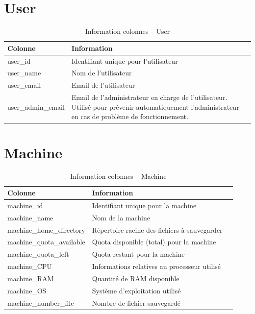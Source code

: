 \documentclass[a4paper,10pt, twoside]{report}
\begin{document}
\begin{spacing}{1.2}
\section{User}
\begin{table}[h!]
  \centering
  \def\arraystretch{1.5}
  \setlength{\fboxsep}{13pt} %
  \setlength{\fboxrule}{0pt} %
  \begin{tabular}{lm{6cm}m{6cm}}
   \rowcolor{arkred} 
    \arrayrulecolor{gray73}\hline
    \color{white} \textbf{Colonne} & \color{white} \textbf{Information}\\
    \hline
    user\_id & Identifiant unique pour l'utilisateur\\
    \hline
    user\_name & Nom de l'utilisateur\\
    \hline
    user\_email & Email de l'utilisateur\\
    \hline
    user\_admin\_email & Email de l'administrateur en charge de l'utilisateur.
    Utilis\'e pour pr\'evenir automatiquement l'administrateur en cas de
    probl\`eme de fonctionnement.
  \end{tabular}
  \caption{\label{tabDBRUser} Information colonnes -- User}
\end{table}

\section{Machine}
\begin{table}[h!]
  \centering
  \def\arraystretch{1.5}
  \setlength{\fboxsep}{13pt} %
  \setlength{\fboxrule}{0pt} %
  \begin{tabular}{lm{6cm}m{6cm}}
   \rowcolor{arkred} 
    \arrayrulecolor{gray73}\hline
    \color{white} \textbf{Colonne} & \color{white} \textbf{Information}\\
    \hline
    machine\_id & Identifiant unique pour la machine\\
    \hline
    machine\_name & Nom de la machine\\
    \hline
    machine\_home\_directory & R\'epertoire racine des fichiers \`a
    sauvegarder\\
    \hline
    machine\_quota\_available & Quota disponible (total) pour la machine\\
    \hline
    machine\_quota\_left & Quota restant pour la machine\\
    \hline
    machine\_CPU & Informations relatives au processeur utilis\'e\\
    \hline
    machine\_RAM & Quantit\'e de RAM disponible\\
    \hline
    machine\_OS & Syst\`eme d'exploitation utilis\'e\\
    \hline
    machine\_number\_file & Nombre de fichier sauvegard\'e
  \end{tabular}
  \caption{\label{tabDBRMachine} Information colonnes -- Machine}
\end{table}


\end{spacing}
\end{document}
